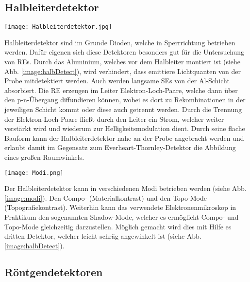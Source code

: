 \subsection*{Halbleiterdetektor}
\label{sub:halbDetect}
\begin{center}
    \texttt{[image: Halbleiterdetektor.jpg]}
    \label{image:halbDetect}
\end{center}
Halbleiterdetektor sind im Grunde Dioden, welche in Sperrrichtung betrieben werden. Dafür eigenen sich diese Detektoren besonders gut für die Untersuchung von REs. Durch das Aluminium, welches vor dem Halbleiter montiert ist (siehe Abb. \ref{image:halbDetect}), wird verhindert, dass emittiere Lichtquanten von der Probe mitdetektiert werden. Auch werden langsame SEs von der Al-Schicht absorbiert. Die RE erzeugen im Leiter Elektron-Loch-Paare, welche dann über den p-n-Übergang diffundieren können, wobei es dort zu Rekombinationen in der jeweiligen Schicht kommt oder diese auch getrennt werden. Durch die Trennung der Elektron-Loch-Paare fließt durch den Leiter ein Strom, welcher weiter verstärkt wird und wiederum zur Helligkeitsmodulation dient. Durch seine flache Bauform kann der Halbleiterdetektor nahe an der Probe angebracht werden und erlaubt damit im Gegensatz zum Everheart-Thornley-Detektor die Abbildung eines großen Raumwinkels.
\begin{center}
    \texttt{[image: Modi.png]}
    \label{image:modi}
\end{center}
Der Halbleiterdetektor kann in verschiedenen Modi betrieben werden (siehe Abb. \ref{image:modi}). Den Compo- (Materialkontrast) und den Topo-Mode (Topografiekontrast).
Weiterhin kann das verwendete Elektronenmikroskop in Praktikum den sogenannten Shadow-Mode, welcher es ermöglicht Compo- und Topo-Mode gleichzeitig darzustellen. Möglich gemacht wird dies mit Hilfe es dritten Detektor, welcher leicht schräg angewinkelt ist (siehe Abb. \ref{image:halbDetect}).
\subsection{Röntgendetektoren}
